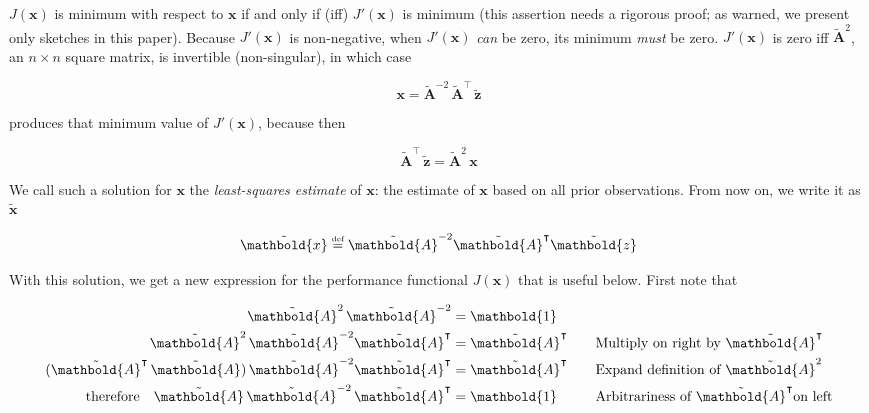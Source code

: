 \documentclass[10pt,oneside,x11names]{article}
\begin{document}
\noindent \(J(\mathbold{x})\) is minimum with respect to \(\mathbold{x}\) if and
only if (iff) \(J'(\mathbold{x})\) is minimum (this assertion needs a rigorous
proof; as warned, we present only sketches in this paper). Because
\(J'(\mathbold{x})\) is non-negative, when \(J'(\mathbold{x})\) \emph{can} be zero, its
minimum \emph{must} be zero. \(J'(\mathbold{x})\) is zero iff
\({\tilde{\mathbold{A}}}^2\), an \(n\times{n}\) square matrix, is invertible
(non-singular), in which case

\begin{equation*}
\mathbold{x}=
{\tilde{\mathbold{A}}}^{-2}\,
{\tilde{\mathbold{A}}}^\intercal\,
{\tilde{\mathbold{z}}}
\end{equation*}

\noindent produces that minimum value of \(J'(\mathbold{x})\), because then

\begin{equation*}
{\tilde{\mathbold{A}}}^\intercal\,
{\tilde{\mathbold{z}}}=
{\tilde{\mathbold{A}}}^2\,
\mathbold{x}
\end{equation*}

We call such a solution for \(\mathbold{x}\) the \emph{least-squares estimate} of
\(\mathbold{x}\): the estimate of
\(\mathbold{x}\) based on all prior observations.
From now on, we write it as \({\tilde{\mathbold{x}}}\)

\begin{equation}
\label{eqn:least-squares-estimate}
\tilde{\mathbold{x}}
\stackrel{\text{\tiny def}}{=}
{\tilde{\mathbold{A}}}^{-2}
{\tilde{\mathbold{A}}}^\intercal
{\tilde{\mathbold{z}}} 
\end{equation}

With this solution, we get a new expression for the performance functional
\(J(\mathbold{x})\) that is  useful below. First note that 

\begin{alignat}{6}
\notag
{\tilde{\mathbold{A}}}^2\,
{\tilde{\mathbold{A}}}^{-2}
&=
\mathbold{1}
&& \text{}
\\
\notag
{\tilde{\mathbold{A}}}^2\,
{\tilde{\mathbold{A}}}^{-2}
{\tilde{\mathbold{A}}}^\intercal
&=
{\tilde{\mathbold{A}}}^\intercal
&& 
\quad\text{Multiply on right by }\tilde{\mathbold{A}}^\intercal
\\
\notag
({\tilde{\mathbold{A}}}^\intercal\,
{\tilde{\mathbold{A}}})\,
{\tilde{\mathbold{A}}}^{-2}
{\tilde{\mathbold{A}}}^\intercal
&=
{\tilde{\mathbold{A}}}^\intercal
&&
\quad\text{Expand definition of }{\tilde{\mathbold{A}}}^2
\\
\label{eqn:aa2at-is-one}
\mathrm{therefore}\quad
{\tilde{\mathbold{A}}}\,
{\tilde{\mathbold{A}}}^{-2}\,
{\tilde{\mathbold{A}}}^\intercal
&=
\mathbold{1}
&&
\quad\text{Arbitrariness of }\tilde{\mathbold{A}}^\intercal\text{on left}
\end{alignat}
\end{document}
